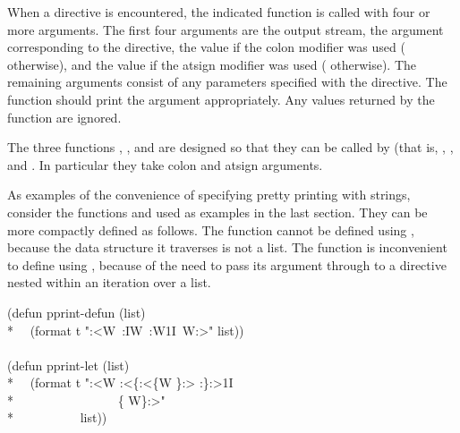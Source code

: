\begin{flushdesc}
When a  directive is encountered, the indicated
function is called with four or more arguments.  The first four arguments
are the output stream, the  argument corresponding to the
directive, the value  if the colon modifier was used (
otherwise), and the value  if the atsign modifier was used (
otherwise).  The remaining arguments consist of any parameters specified
with the directive.  The function should print the argument appropriately.
Any values returned by the function are ignored.

The three functions , , and
 are designed so that they can be called by
 (that is, ,
, and .  In
particular they take colon and atsign arguments.
\end{flushdesc}

As examples of the convenience of specifying pretty printing with
 strings, consider the functions 
and  used as
examples in the last section.  They can be more compactly defined as follows.  The
function  cannot be defined using , because the data
structure it traverses is not a list.  The function  is
inconvenient to define using , because of the need to pass its
 argument through to a  directive nested within
an iteration over a list.
\begin{lisp}
(defun pprint-defun (list) \\*
~~(format t
"{\Xtilde}:<{\Xtilde}W~{\Xtilde}\Xatsign\Xunderscore{\Xtilde}:I{\Xtilde}W~{\Xtilde}:\Xunderscore{\Xtilde}W{\Xtilde}1I~{\Xtilde}\Xunderscore{\Xtilde}W{\Xtilde}:>"
list))\\
 \\
(defun pprint-let (list) \\*
~~(format t "{\Xtilde}:<{\Xtilde}W{\Xtilde}{\Xcircumflex} \relax
  {\Xtilde}:<{\Xtilde}{\Xatsign}\{{\Xtilde}:<{\Xtilde}{\Xatsign}\{{\Xtilde}W{\Xtilde}{\Xcircumflex} \relax
      {\Xtilde}{\Xunderscore}{\Xtilde}\}{\Xtilde}:>{\Xtilde}{\Xcircumflex} \relax
      {\Xtilde}:{\Xunderscore}{\Xtilde}\}{\Xtilde}:>{\Xtilde}1I{\Xtilde} \\*
~~~~~~~~~~~~~~~~{\Xtilde}{\Xatsign}\{{\Xtilde}{\Xcircumflex} {\Xtilde}{\Xunderscore}{\Xtilde}W{\Xtilde}\}{\Xtilde}:>" \\*
~~~~~~~~~~list))
\end{lisp}

